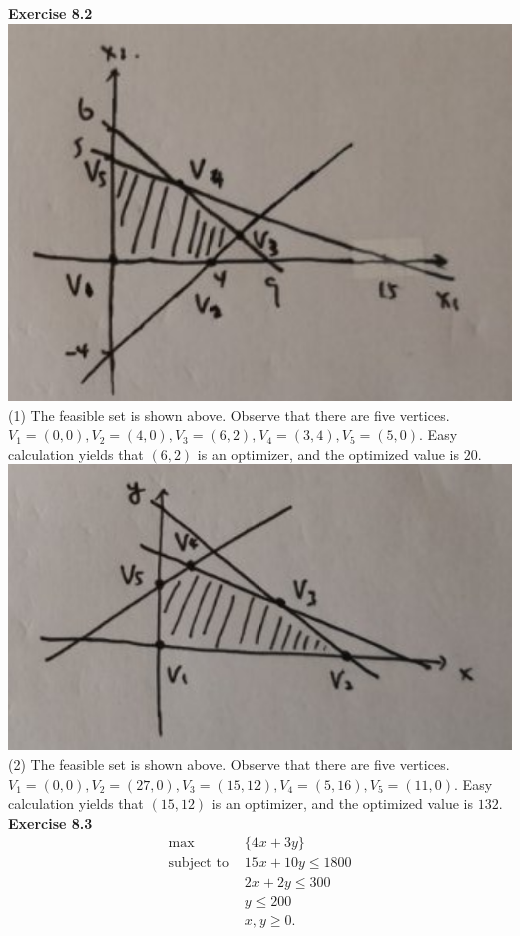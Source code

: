 \documentclass[letterpaper,12pt]{article}
\theoremstyle{definition}
\begin{document}
\noindent\textbf{Exercise 8.2} \\
\includegraphics{12.png}\\
(1) The feasible set is shown above. Observe that there are five vertices. $V_1 = (0,0), V_2 = (4,0), V_3 = (6, 2), V_4 = (3, 4), V_5 = (5,0).$ Easy calculation yields that $(6, 2)$ is an optimizer, and the optimized value is $20.$ \\
\includegraphics{13.png}\\
(2) The feasible set is shown above. Observe that there are five vertices. $V_1 = (0,0), V_2 = (27,0), V_3 = (15, 12), V_4 = (5, 16), V_5 = (11,0).$ Easy calculation yields that $(15, 12)$ is an optimizer, and the optimized value is $132.$ \\

\noindent\textbf{Exercise 8.3} \\
\begin{align*}
  \max &\{4x + 3y\} \\
  \text{subject to } &15x+10y \leq 1800 \\
  &2x+2y \leq 300 \\
  &y\leq 200 \\
  &x, y \geq 0.
\end{align*}
\end{document}
